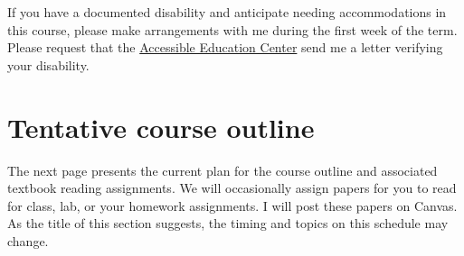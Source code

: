 \documentclass[10pt]{article}
\begin{document}
If you have a documented disability and anticipate needing accommodations in this course, please make arrangements with me during the first week of the term. Please request that the \href{https://aec.uoregon.edu/}{Accessible Education Center} send me a letter verifying your disability.

\section*{Tentative course outline}

The next page presents the current plan for the course outline and associated textbook reading assignments. We will occasionally assign papers for you to read for class, lab, or your homework assignments. I will post these papers on Canvas. As the title of this section suggests, the timing and topics on this schedule may change.
\end{document}
